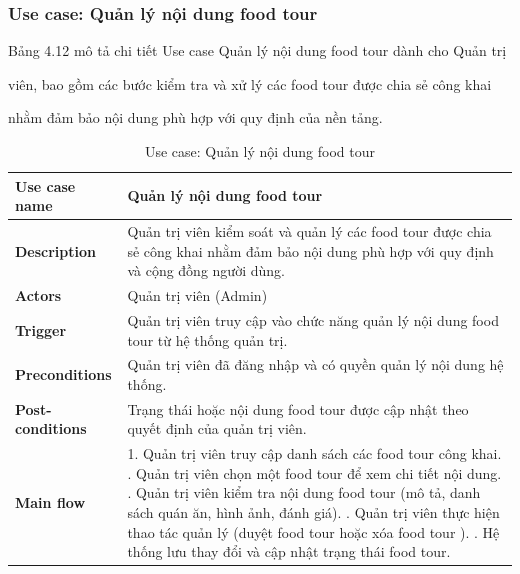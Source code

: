 
\subsubsection{Use case: Quản lý nội dung food tour}

Bảng 4.12 mô tả chi tiết Use case Quản lý nội dung food tour dành cho Quản trị

viên, bao gồm các bước kiểm tra và xử lý các food tour được chia sẻ công khai

nhằm đảm bảo nội dung phù hợp với quy định của nền tảng.


\begingroup
\renewcommand{\arraystretch}{1.25}
\begin{longtable}{|p{4cm}|p{10cm}|}
\caption{Use case: Quản lý nội dung food tour} \\
\endfirsthead

\endhead

\endfoot

\endlastfoot

\hline

\textbf{Use case name} &
Quản lý nội dung food tour \\
\hline

\textbf{Description} &
Quản trị viên kiểm soát và quản lý các food tour được chia sẻ công khai nhằm đảm bảo nội dung phù hợp với quy định và cộng đồng người dùng. \\
\hline

\textbf{Actors} &
Quản trị viên (Admin) \\
\hline

\textbf{Trigger} &
Quản trị viên truy cập vào chức năng quản lý nội dung food tour từ hệ thống quản trị. \\
\hline

\textbf{Preconditions} &
Quản trị viên đã đăng nhập và có quyền quản lý nội dung hệ thống. \\
\hline

\textbf{Post-conditions} &
Trạng thái hoặc nội dung food tour được cập nhật theo quyết định của quản trị viên. \\
\hline

\textbf{Main flow} &
1. Quản trị viên truy cập danh sách các food tour công khai. \newline 2. Quản trị viên chọn một food tour để xem chi tiết nội dung. \newline 3. Quản trị viên kiểm tra nội dung food tour (mô tả, danh sách quán ăn, hình ảnh, đánh giá). \newline 4. Quản trị viên thực hiện thao tác quản lý (duyệt food tour hoặc xóa food tour ). \newline 5. Hệ thống lưu thay đổi và cập nhật trạng thái food tour. \\
\hline


\end{longtable}
